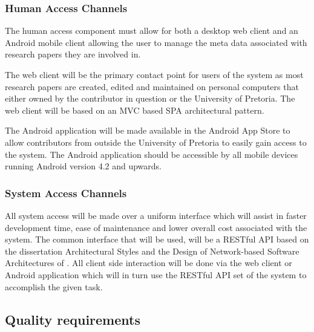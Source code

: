 \documentclass[a4paper,10pt]{article}
\begin{document}
\subsubsection{Human Access Channels}
The human access component must allow for both a desktop web client and an Android mobile client allowing the user to manage the meta data associated with research papers they are involved in. 

The web client will be the primary contact point for users of the system as most research papers are created, edited and maintained on personal computers that either owned by the contributor in question or the University of Pretoria. The web client will be based on an MVC based SPA architectural pattern. 

The Android application will be made available in the Android App Store to allow contributors from outside the University of Pretoria to easily gain access to the system. The Android application should be accessible by all mobile devices running Android version 4.2 and upwards.

\subsubsection{System Access Channels}
All system access will be made over a uniform interface which will assist in faster development time, ease of maintenance and lower overall cost associated with the system. The common interface that will be used, will be a RESTful API based on the dissertation Architectural Styles and
the Design of Network-based Software Architectures of \textcite{fielding}.  All client side interaction will be done via the web client or Android application which will in turn use the RESTful API set of the system to accomplish the given task.

\subsection{Quality requirements}
\end{document}
